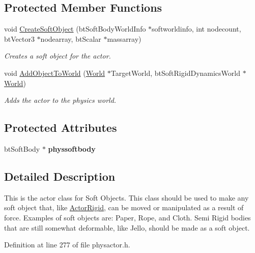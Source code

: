 \subsection*{Protected Member Functions}
\begin{DoxyCompactItemize}
\item 
void \hyperlink{classActorSoft_a01a570c728d6cb96d1a40003d6b17e22}{CreateSoftObject} (btSoftBodyWorldInfo $\ast$softworldinfo, int nodecount, btVector3 $\ast$nodearray, btScalar $\ast$massarray)
\begin{DoxyCompactList}\small\item\em Creates a soft object for the actor. \item\end{DoxyCompactList}\item 
void \hyperlink{classActorSoft_a2c9b96e757040add73272ed392c3a464}{AddObjectToWorld} (\hyperlink{classphys_1_1World}{World} $\ast$TargetWorld, btSoftRigidDynamicsWorld $\ast$\hyperlink{classphys_1_1World}{World})
\begin{DoxyCompactList}\small\item\em Adds the actor to the physics world. \item\end{DoxyCompactList}\end{DoxyCompactItemize}
\subsection*{Protected Attributes}
\begin{DoxyCompactItemize}
\item 
\hypertarget{classActorSoft_aa7d4efd5150008eecc54e070be075700}{
btSoftBody $\ast$ {\bfseries physsoftbody}}
\label{d5/da4/classActorSoft_aa7d4efd5150008eecc54e070be075700}

\end{DoxyCompactItemize}


\subsection{Detailed Description}
This is the actor class for Soft Objects. This class should be used to make any soft object that, like \hyperlink{classActorRigid}{ActorRigid}, can be moved or manipulated as a result of force. Examples of soft objects are: Paper, Rope, and Cloth. Semi Rigid bodies that are still somewhat deformable, like Jello, should be made as a soft object. 

Definition at line 277 of file physactor.h.



